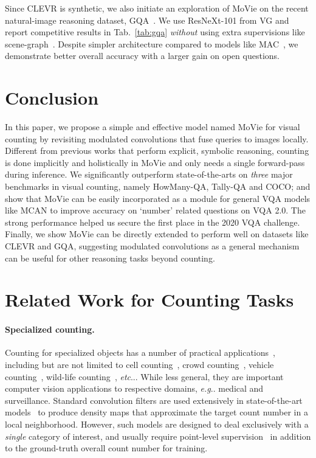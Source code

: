 \documentclass{article} \usepackage[dvipsnames,table]{xcolor}
\makeatletter
\def\vs{{\bm{s}}}
\newcommand{\ours}[0]{MoVie\xspace}
\DeclareRobustCommand\onedot{\futurelet\@let@token\@onedot}
\def\@onedot{\ifx\@let@token.\else.\null\fi\xspace}
\def\eg{\emph{e.g}\onedot} \def\Eg{\emph{E.g}\onedot}
\def\etc{\emph{etc}\onedot} \def\vs{\emph{vs}\onedot}
\makeatother
\begin{document}
Since CLEVR is synthetic, we also initiate an exploration of \ours on the recent natural-image reasoning dataset, GQA~\cite{hudson2019gqa}. We use ResNeXt-101 from VG and report competitive results in Tab.~\ref{tab:gqa} \emph{without} using extra supervisions like scene-graph~\cite{krishna2017visual}. Despite simpler architecture compared to models like MAC~\cite{hudson2018compositional}, we demonstrate better overall accuracy with a larger gain on open questions. 

\section{Conclusion}
In this paper, we propose a simple and effective model named \ours for visual counting by revisiting modulated convolutions that fuse queries to images locally. Different from previous works that perform explicit, symbolic reasoning, counting is done implicitly and holistically in \ours and only needs a single forward-pass during inference. We significantly outperform state-of-the-arts on \emph{three} major benchmarks in visual counting, namely HowMany-QA, Tally-QA and COCO; and show that \ours can be easily incorporated as a module for general VQA models like MCAN to improve accuracy on `number' related questions on VQA 2.0. The strong performance helped us secure the first place in the 2020 VQA challenge. Finally, we show \ours can be directly extended to perform well on datasets like CLEVR and GQA, suggesting modulated convolutions as a general mechanism can be useful for other reasoning tasks beyond counting.

\appendix

\section{Related Work for Counting Tasks\label{sec:related2}}
\paragraph{Specialized counting.} Counting for specialized objects has a number of practical applications~\cite{marsden2018people}, including but are not limited to cell counting~\cite{xie2018microscopy}, crowd counting~\cite{sindagi2017survey}, vehicle counting~\cite{onoro2016towards}, wild-life counting~\cite{arteta2016counting}, \etc. While less general, they are important computer vision applications to respective domains, \eg medical and surveillance. Standard convolution filters are used extensively in state-of-the-art models~\cite{cheng2019learning} to produce density maps that approximate the target count number in a local neighborhood. However, such models are designed to deal exclusively with a \emph{single} category of interest, and usually require point-level supervision~\cite{sindagi2017survey} in addition to the ground-truth overall count number for training. 
\end{document}
